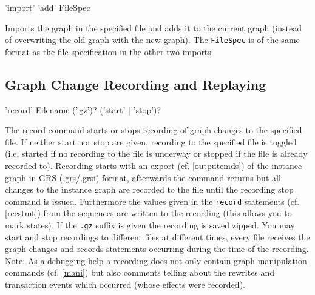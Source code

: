 \begin{rail}
  'import' 'add' FileSpec
\end{rail}
Imports the graph in the specified file and adds it to the current graph
(instead of overwriting the old graph with the new graph).
The \texttt{FileSpec} is of the same format as the file specification in the other two imports.

\subsection{Graph Change Recording and Replaying}
\label{recordnreplay}

\begin{rail}
  'record' Filename ('.gz')? ('start' | 'stop')?
\end{rail}
The record command starts or stops recording of graph changes to the specified file. If neither start nor stop are given, recording to the specified file is toggled (i.e. started if no recording to the file is underway or stopped if the file is already recorded to).
Recording starts with an export (cf. \ref{outputcmds}) of the instance graph in GRS (.grs/.grsi) format, afterwards the command returns but all changes to the instance graph are recorded to the file until the recording stop command is issued.
Furthermore the values given in the \texttt{record} statements (cf. \ref{recstmt}) from the sequences are written to the recording (this allows you to mark states).
If the \texttt{.gz} suffix is given the recording is saved zipped.
You may start and stop recordings to different files at different times, every file receives the graph changes and records statements occurring during the time of the recording.
Note: As a debugging help a recording does not only contain graph manipulation commands (cf. \ref{mani}) but also comments telling about the rewrites and transaction events which occurred (whose effects were recorded).

